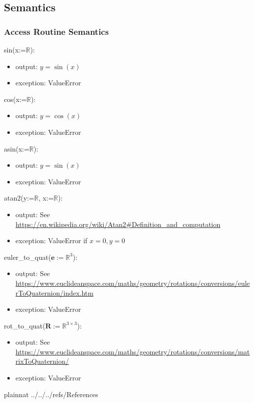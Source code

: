 \documentclass[12pt, titlepage]{article}
\begin{document}
\subsection{Semantics}

\subsubsection{Access Routine Semantics}

\noindent sin(x:=$\mathbb{R}$):
\begin{itemize}
\item output: $y = \sin(x)$
\item exception: ValueError
\end{itemize}

\noindent cos(x:=$\mathbb{R}$):
\begin{itemize}
\item output: $y = \cos(x)$
\item exception: ValueError
\end{itemize}

\noindent asin(x:=$\mathbb{R}$):
\begin{itemize}
\item output: $y = \sin(x)$
\item exception: ValueError
\end{itemize}

\noindent atan2(y:=$\mathbb{R}$, x:=$\mathbb{R}$):
\begin{itemize}
\item output: See \url{https://en.wikipedia.org/wiki/Atan2#Definition_and_computation}
\item exception: ValueError if $x =0, y =0$
\end{itemize}

\noindent euler\_to\_quat($\mathbf{e}:=\mathbb{R}^3$):
\begin{itemize}
\item output: See \url{https://www.euclideanspace.com/maths/geometry/rotations/conversions/eulerToQuaternion/index.htm}
\item exception: ValueError
\end{itemize}

\noindent rot\_to\_quat($\mathbf{R} := \mathbb{R}^{3 \times 3}$):
\begin{itemize}
\item output: See \url{https://www.euclideanspace.com/maths/geometry/rotations/conversions/matrixToQuaternion/}
\item exception: ValueError
\end{itemize}

\newpage

 {plainnat}
 {../../../refs/References}

\end{document}
